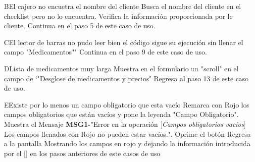 		\begin{UCtrayectoriaA}{B}{El cajero no encuetra el nombre del cliente}
			\UCpaso [\UCactor] Busca el nombre del cliente en el checklist pero no lo encuentra. 
			\UCpaso [\UCactor] Verifica la información proporcionada por le cliente.
			\UCpaso [\UCactor] Continua en el paso 5 de este caso de uso.			
		\end{UCtrayectoriaA}
		\begin{UCtrayectoriaA}{C}{El lector de barras no pudo leer bien el código}
			\UCpaso sigue su ejecución sin llenar el campo "Medicamentos""
			\UCpaso Continua en el paso 9 de este caso de uso.	
		\end{UCtrayectoriaA}
		\begin{UCtrayectoriaA}{D}{Lista de medicamentos muy larga }
			\UCpaso Muestra en el formulario  un "scroll" en el campo de `"Desglose de medicamentos y precios"
			\UCpaso Regresa al paso 13 de este caso de uso.
		\end{UCtrayectoriaA}		
			\begin{UCtrayectoriaA}{E}{Existe por lo menos un campo obligatorio que esta vacío}
			\UCpaso Remarca con Rojo los campos obligatorios que están vacíos y pone la leyenda "Campo Obligatorio".
			\UCpaso Muestra el Mensaje {\bf MSG1-}"Error en la operación [{\em Campos obligatorios vacíos}] Los campos llenados con Rojo no pueden estar vacíos.".
			\UCpaso[\UCactor] Oprime el botón 
			\UCpaso Regresa a la pantalla  Mostrando los campos en rojo y dejando la información introducida por el [\UCactor] en los pasos anteriores de este casos de uso
		\end{UCtrayectoriaA}
